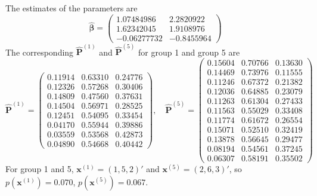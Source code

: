 \documentclass[12pt]{article}
\newcommand{\Pmat}{\mathbf{P}}
\newcommand{\wh}{\widehat}
\begin{document}
The estimates of the parameters are
\begin{equation*}
\wh{\boldsymbol{\beta}} =
\begin{pmatrix}
 1.07484986 & 2.2820922 \\
 1.62342045 & 1.9108976 \\
 -0.06277732 &-0.8455964
\end{pmatrix}
\end{equation*}
The corresponding $\wh{\Pmat}^{(1)}$ and $\wh{\Pmat}^{(5)}$ for group 1 and group 5 are
\begin{equation*}
    \wh{\Pmat}^{(1)} = \begin{pmatrix}

 0.11914 & 0.63310 & 0.24776\\
 0.12326 & 0.57268 & 0.30406\\
 0.14809 & 0.47560 & 0.37631\\
 0.14504 & 0.56971 & 0.28525\\
 0.12451 & 0.54095 & 0.33454\\
 0.04170 & 0.55944 & 0.39886\\
 0.03559 & 0.53568 & 0.42873\\
 0.04890 & 0.54668 & 0.40442
    \end{pmatrix}, \quad
    \wh{\Pmat}^{(5)} = \begin{pmatrix}
 0.15604 & 0.70766 & 0.13630\\
 0.14469 & 0.73976 & 0.11555\\
 0.11246 & 0.67372 & 0.21382\\
 0.12036 & 0.64885 & 0.23079\\
 0.11263 & 0.61304 & 0.27433\\
 0.11563 & 0.55029 & 0.33408\\
 0.11774 & 0.61672 & 0.26554\\
 0.15071 & 0.52510 & 0.32419\\
 0.13878 & 0.56645 & 0.29477\\
 0.08194 & 0.54561 & 0.37245\\
 0.06307 & 0.58191 & 0.35502
    \end{pmatrix}
\end{equation*}
For group 1 and 5, $\boldsymbol{x}^{(1)} = (1,5,2)'$ and $\boldsymbol{x}^{(5)} = (2,6,3)'$, so $p(\boldsymbol{x}^{(1)}) = 0.070$, $p(\boldsymbol{x}^{(5)}) = 0.067$.

\end{document}
